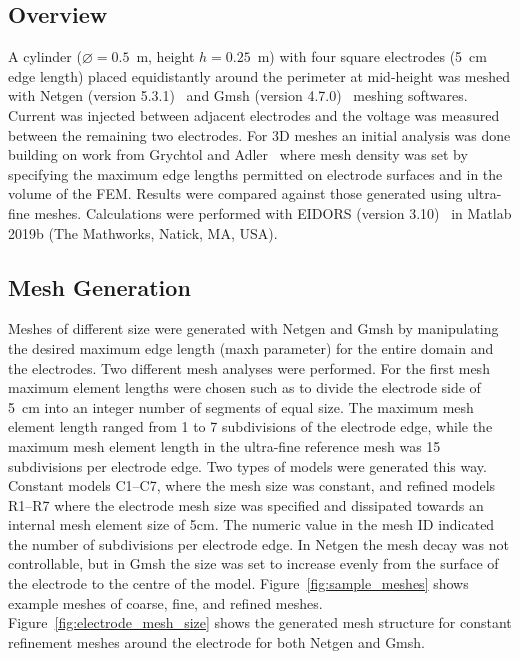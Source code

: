 \documentclass[12pt]{iopart}
\begin{document}
\subsection{Overview}
A cylinder ($\diameter=0.5$~m, height $h=0.25$~m) with four square electrodes 
(5~cm edge length) placed equidistantly around the perimeter at mid-height was
meshed with Netgen (version 5.3.1)~\parencite{schoberl_netgen_1997} and Gmsh 
(version 4.7.0)~\parencite{geuzaine_gmsh_2009}
meshing softwares.
Current was injected between adjacent electrodes and the voltage was measured between the remaining
two electrodes.
For 3D meshes an initial analysis was done building on work from 
Grychtol and Adler~\parencite{grychtol_fem_2013} where mesh density was
set by specifying the maximum edge lengths permitted on electrode surfaces
and in the volume of the FEM.
Results were compared against those generated using ultra-fine meshes. 
Calculations were performed with EIDORS (version 3.10)~\parencite{adler_uses_2006} 
in Matlab 2019b
(The Mathworks, Natick, MA, USA).


\subsection{Mesh Generation}
Meshes of different size were generated with Netgen and Gmsh by manipulating the desired
maximum edge length (maxh parameter) for the entire domain and the electrodes.
Two different mesh analyses were performed. For the first
mesh maximum element lengths were
chosen such as to divide the electrode side of 5~cm into an integer number of
segments of equal size. 
The maximum mesh element length ranged from 1 to 7 subdivisions of the electrode 
edge, while the maximum mesh element length in the ultra-fine reference mesh  
was 15 subdivisions per 
electrode edge. 
Two types of models were generated this way. Constant models C1--C7, where the mesh size 
was constant, and refined models R1--R7 where the electrode mesh size was specified and 
dissipated towards an internal mesh element size of 5cm. The numeric value in the mesh 
ID indicated the number of subdivisions per electrode edge. 
In Netgen the mesh decay was not controllable, but in Gmsh the size was set 
to increase evenly from the surface of the electrode to the centre of the model.
Figure~\ref{fig:sample_meshes} shows example meshes of coarse, fine, and refined
meshes. Figure~\ref{fig:electrode_mesh_size} shows the generated mesh structure for 
constant refinement meshes around the electrode 
for both Netgen and Gmsh. 
\end{document}
